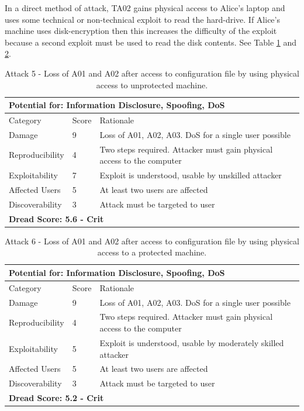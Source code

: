 \documentclass [11pt, proquest] {uwthesis}[2020/02/24]
\begin{document}
In a direct method of attack, TA02 gains physical access to Alice's laptop and uses some technical or non-technical exploit to read the hard-drive. If Alice's machine uses disk-encryption then this increases the difficulty of the exploit because a second exploit must be used to read the disk contents.
See Table \ref{ref:attack5} and \ref{ref:attack6}.
\begin{table}[H]
\begin{tabular}{|m{3cm}|m{1cm}|p{27em} |}
\multicolumn{3}{l}{Potential for: Information Disclosure, Spoofing, DoS}                   \\
\hline
Category & Score & Rationale \\
\hline
Damage          & 9     & Loss of A01, A02, A03. DoS for a single user possible            \\
\hline
Reproducibility & 4     & Two steps required. Attacker must gain physical access to the computer     \\
\hline
Exploitability & 7      & Exploit is understood, usable by unskilled attacker \\
\hline
Affected Users  & 5     & At least two users are affected                      \\
\hline
Discoverability & 3     & Attack must be targeted to user \\
\hline
\multicolumn{3}{l}{\textbf{Dread Score: 5.6 - Crit}} 
\end{tabular}
\caption{Attack 5 - Loss of A01 and A02 after access to configuration file by using physical access to unprotected machine.}
\label{ref:attack5}
\end{table}

\begin{table}[H]
\begin{tabular}{|m{3cm}|m{1cm}|p{27em} |}
\multicolumn{3}{l}{Potential for: Information Disclosure, Spoofing, DoS}        \\
\hline
Category & Score & Rationale \\
\hline
Damage   & 9 & Loss of A01, A02, A03. DoS for a single user possible    
 \\
\hline
Reproducibility & 4  & Two steps required. Attacker must gain physical access to the computer \\
\hline
Exploitability & 5      & Exploit is understood, usable by moderately skilled attacker  \\
\hline
Affected Users  & 5     & At least two users are affected                      \\
\hline
Discoverability & 3     & Attack must be targeted to user \\
\hline
\multicolumn{3}{l}{\textbf{Dread Score: 5.2 - Crit}} 
\end{tabular}
\caption{Attack 6 - Loss of A01 and A02 after access to configuration file by using physical access to a protected machine.}
\label{ref:attack6}
\end{table}
\end{document}
